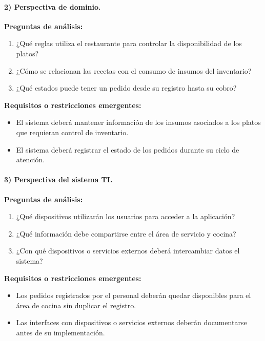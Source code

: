 \paragraph{2) Perspectiva de dominio.}

\textbf{Preguntas de análisis:}
\begin{enumerate}
    \item ¿Qué reglas utiliza el restaurante para controlar la disponibilidad de los platos?
    \item ¿Cómo se relacionan las recetas con el consumo de insumos del inventario?
    \item ¿Qué estados puede tener un pedido desde su registro hasta su cobro?
\end{enumerate}

\textbf{Requisitos o restricciones emergentes:}
\begin{itemize}
    \item El sistema deberá mantener información de los insumos asociados a los
    platos que requieran control de inventario.
    \item El sistema deberá registrar el estado de los pedidos durante su ciclo
    de atención.
\end{itemize}

\paragraph{3) Perspectiva del sistema TI.}

\textbf{Preguntas de análisis:}
\begin{enumerate}
    \item ¿Qué dispositivos utilizarán los usuarios para acceder a la aplicación?
    \item ¿Qué información debe compartirse entre el área de servicio y cocina?
    \item ¿Con qué dispositivos o servicios externos deberá intercambiar datos el sistema?
\end{enumerate}

\textbf{Requisitos o restricciones emergentes:}
\begin{itemize}
    \item Los pedidos registrados por el personal deberán quedar disponibles
    para el área de cocina sin duplicar el registro.
    \item Las interfaces con dispositivos o servicios externos deberán
    documentarse antes de su implementación.
\end{itemize}

